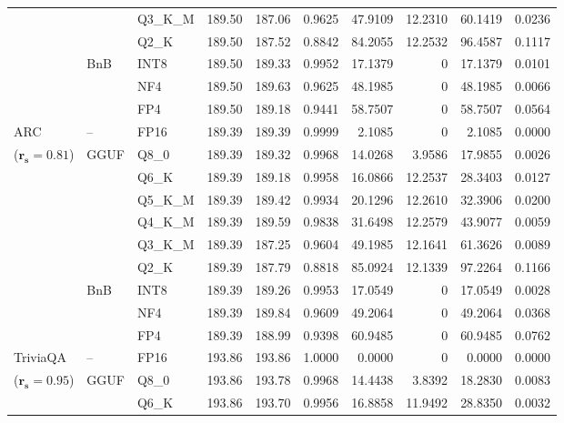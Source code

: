 \begin{longtable}{ll l rrrrrrr}
 &  & Q3\_K\_M & 189.50 & 187.06 & 0.9625 & 47.9109 & 12.2310 & 60.1419 & 0.0236 \\
 &  & Q2\_K & 189.50 & 187.52 & \cellcolor{red!18} 0.8842 & \cellcolor{red!18} 84.2055 & 12.2532 & \cellcolor{red!18} 96.4587 & \cellcolor{red!18} 0.1117 \\
 & BnB & INT8 & 189.50 & 189.33 & 0.9952 & 17.1379 & \cellcolor{cyan!12} $0$ & 17.1379 & 0.0101 \\
 &  & NF4 & 189.50 & 189.63 & 0.9625 & 48.1985 & \cellcolor{cyan!12} $0$ & 48.1985 & 0.0066 \\
 &  & FP4 & 189.50 & 189.18 & \cellcolor{red!18} 0.9441 & \cellcolor{red!18} 58.7507 & \cellcolor{cyan!12} $0$ & \cellcolor{red!18} 58.7507 & \cellcolor{red!18} 0.0564 \\
\midrule
ARC & -- & FP16 & 189.39 & 189.39 & 0.9999 & 2.1085 & \cellcolor{cyan!12} $0$ & 2.1085 & 0.0000 \\
{\small ($\mathbf{r_s{=}0.81}$)} & GGUF & Q8\_0 & 189.39 & 189.32 & 0.9968 & 14.0268 & 3.9586 & 17.9855 & 0.0026 \\
 &  & Q6\_K & 189.39 & 189.18 & 0.9958 & 16.0866 & 12.2537 & 28.3403 & 0.0127 \\
 &  & Q5\_K\_M & 189.39 & 189.42 & 0.9934 & 20.1296 & 12.2610 & 32.3906 & 0.0200 \\
 &  & Q4\_K\_M & 189.39 & 189.59 & 0.9838 & 31.6498 & 12.2579 & 43.9077 & 0.0059 \\
 &  & Q3\_K\_M & 189.39 & 187.25 & 0.9604 & 49.1985 & 12.1641 & 61.3626 & 0.0089 \\
 &  & Q2\_K & 189.39 & 187.79 & \cellcolor{red!18} 0.8818 & \cellcolor{red!18} 85.0924 & 12.1339 & \cellcolor{red!18} 97.2264 & \cellcolor{red!18} 0.1166 \\
 & BnB & INT8 & 189.39 & 189.26 & 0.9953 & 17.0549 & \cellcolor{cyan!12} $0$ & 17.0549 & 0.0028 \\
 &  & NF4 & 189.39 & 189.84 & 0.9609 & 49.2064 & \cellcolor{cyan!12} $0$ & 49.2064 & 0.0368 \\
 &  & FP4 & 189.39 & 188.99 & \cellcolor{red!18} 0.9398 & \cellcolor{red!18} 60.9485 & \cellcolor{cyan!12} $0$ & \cellcolor{red!18} 60.9485 & \cellcolor{red!18} 0.0762 \\
\midrule
TriviaQA & -- & FP16 & 193.86 & 193.86 & 1.0000 & 0.0000 & \cellcolor{cyan!12} $0$ & 0.0000 & 0.0000 \\
{\small ($\mathbf{r_s{=}0.95}$)} & GGUF & Q8\_0 & 193.86 & 193.78 & 0.9968 & 14.4438 & 3.8392 & 18.2830 & 0.0083 \\
 &  & Q6\_K & 193.86 & 193.70 & 0.9956 & 16.8858 & 11.9492 & 28.8350 & 0.0032 \\

\end{longtable}
